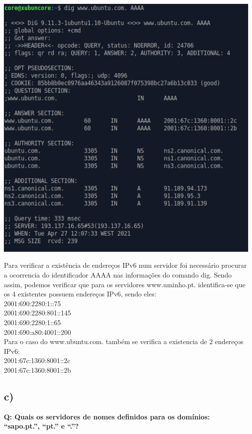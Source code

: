\documentclass[a4paper]{article}
\begin{document}
\begin{center}
	\includegraphics[scale=0.5]{images/1bUbuntu}
\end{center}

Para verificar a existência de endereços IPv6 num servidor foi necessário procurar a ocorrencia do identificador AAAA nas informações do comando dig. Sendo assim, podemos verificar que para os servidores www.uminho.pt. identifica-se que os 4 existentes possuem endereços IPv6, sendo eles:\\
2001:690:2280:1::75\\
2001:690:2280:801::145\\
2001:690:2280:1::65\\
2001:690:a80:4001::200\\
Para o caso do www.ubuntu.com. também se verifica a existencia de 2 endereços IPv6:\\
2001:67c:1360:8001::2c\\
2001:67c:1360:8001::2b\\

\subsection{ c)} \textbf{Q: Quais os servidores de nomes definidos para os domínios: “sapo.pt.”, “pt.” e “.”?} \par
\end{document}
